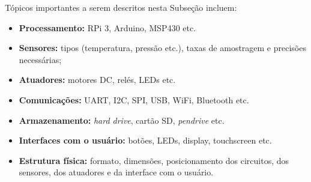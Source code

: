 Tópicos importantes a serem descritos nesta Subseção incluem:

\begin{itemize}
    \item \textbf{Processamento:} RPi 3, Arduino, MSP430 etc.
    \item \textbf{Sensores:} tipos (temperatura, pressão etc.), taxas de amostragem e precisões necessárias;
    \item \textbf{Atuadores:} motores DC, relés, LEDs etc.
    \item \textbf{Comunicações:} UART, I2C, SPI, USB, WiFi, Bluetooth etc.
    \item \textbf{Armazenamento:} \textit{hard drive}, cartão SD, \textit{pendrive} etc.
    \item \textbf{Interfaces com o usuário:} botões, LEDs, display, touchscreen etc.	
    \item \textbf{Estrutura física:} formato, dimensões, posicionamento dos circuitos, dos sensores, dos atuadores e da interface com o usuário.
\end{itemize}
